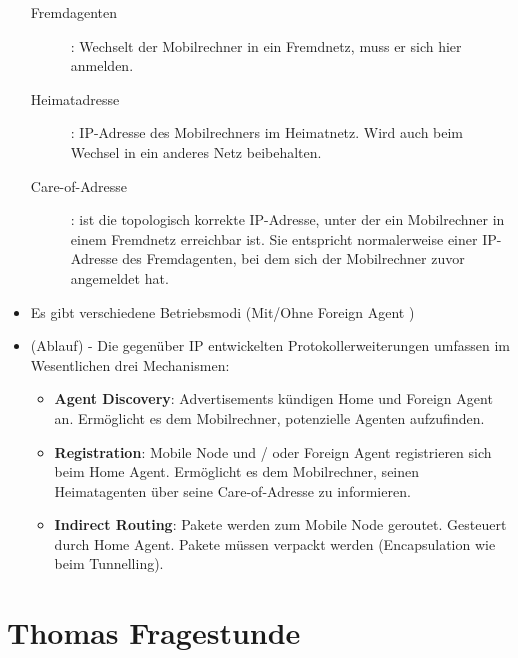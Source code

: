 \documentclass{article} %
\begin{document}
\begin{itemize}
\begin{description}
		\item[Fremdagenten]: Wechselt der Mobilrechner in ein Fremdnetz, muss er sich hier anmelden.
		\item[Heimatadresse]: IP-Adresse des Mobilrechners im Heimatnetz. Wird auch beim Wechsel in ein anderes Netz beibehalten. 
		\item[Care-of-Adresse]: ist die topologisch korrekte IP-Adresse, unter der ein Mobilrechner in einem Fremdnetz erreichbar ist. Sie entspricht normalerweise einer IP-Adresse des Fremdagenten, bei dem sich der Mobilrechner zuvor angemeldet hat.
		\end{description}
	\item Es gibt verschiedene Betriebsmodi (Mit/Ohne Foreign Agent )
	\item (Ablauf) - Die gegenüber IP entwickelten Protokollerweiterungen umfassen im Wesentlichen drei Mechanismen:
		\begin{itemize}
		\item \textbf{Agent Discovery}: Advertisements kündigen Home und Foreign Agent an. Ermöglicht es dem Mobilrechner, potenzielle Agenten aufzufinden.
		\item \textbf{Registration}: Mobile Node und / oder Foreign Agent registrieren sich beim Home Agent.  Ermöglicht es dem Mobilrechner, seinen Heimatagenten über seine Care-of-Adresse zu informieren.
		\item \textbf{Indirect Routing}: Pakete werden zum Mobile Node geroutet. Gesteuert durch Home Agent. Pakete müssen verpackt werden (Encapsulation wie beim Tunnelling). 
		\end{itemize}
	\end{itemize}


\section{Thomas Fragestunde}
\end{document}
